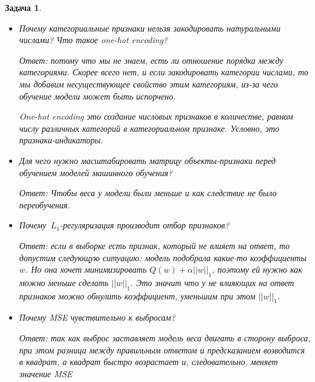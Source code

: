 \documentclass[12pt,fleqn]{article}
\newtheorem{esProblem}{Задача}
\begin{document}
\begin{esProblem}
\begin{itemize}
        Ответ: это способ обучения модели, заключающийся в том, что данные делятся на $n$ частей, одна из которых тестовая, а остальные тренировочные. Мы можем обучить модель на остальных $n-1$ частях, а потестировать на оставшейся. Причём мы будем делать это для всех частей, то есть брать каждую часть за тестовую, а остальные $n-1$ будут обучающие. В итоге мы как будто обучим $n$ моделей. Кросс-авлидация хороша тем, что мы можем подбирать гиперпараметры на валидационных данных (которые являются частью тестовых!), а не на тестовых, так как если подбирать гиперпараметры на тестовых данных, мы можем неявно заложить модели информацию о тестовых данных.
        \item Почему категориальные признаки нельзя закодировать натуральными числами? Что такое one-hot encoding?
        
        Ответ: потому что мы не знаем, есть ли отношение порядка между категориями. Скорее всего нет, и если закодировать категории числами, то мы добавим несуществующее свойство этим категориям, из-за чего обучение модели может быть испорчено.
        
        One-hot encoding это создание числовых признаков в количестве, равном числу различных категорий в категориальном признаке. Условно, это признаки-индикаторы.
        \item Для чего нужно масштабировать матрицу объекты-признаки перед обучением моделей машинного обучения?
        
        Ответ:
        Чтобы веса у модели были меньше и как следствие не было переобучения.
        \item Почему~$L_1$-регуляризация производит отбор признаков?
        
        Ответ: если в выборке есть признак, который не влияет на ответ, то допустим следующую ситуацию: модель подобрала какие-то коэффициенты $w$. Но она хочет минимизировать $Q(w) + \alpha ||w||_1$, поэтому ей нужно как можно меньше сделать $||w||_1$. Это значит что у не влияющих на ответ признаков можно обнулить коэффициент, уменьшим при этом $||w||_1$.
        \item Почему MSE чувствительно к выбросам? 
        
       	Ответ: так как выброс заставляет модель веса двигать в сторону выброса, при этом разница между правильным ответом и предсказанием возводится в квадрат, а квадрат быстро возрастает и, следовательно, меняет значение MSE
    \end{itemize}
\end{esProblem}
\end{document}
